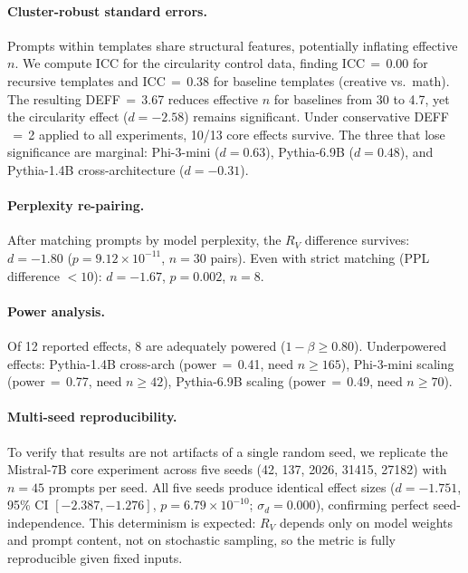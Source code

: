 \documentclass{article}
\newcommand{\RV}{R_V}
\newcommand{\dcohen}{d}
\begin{document}
\paragraph{Cluster-robust standard errors.}
Prompts within templates share structural features, potentially inflating effective $n$.
We compute ICC for the circularity control data, finding ICC$\,{=}\,$0.00 for recursive templates and ICC$\,{=}\,$0.38 for baseline templates (creative vs.\ math).
The resulting DEFF$\,{=}\,$3.67 reduces effective $n$ for baselines from 30 to 4.7, yet the circularity effect ($\dcohen{=}{-}2.58$) remains significant.
Under conservative DEFF$\,{=}\,$2 applied to all experiments, 10/13 core effects survive.
The three that lose significance are marginal: Phi-3-mini ($\dcohen{=}0.63$), Pythia-6.9B ($\dcohen{=}0.48$), and Pythia-1.4B cross-architecture ($\dcohen{=}{-}0.31$).

\paragraph{Perplexity re-pairing.}
After matching prompts by model perplexity, the $\RV$ difference survives: $\dcohen{=}{-}1.80$ ($p{=}9.12 \times 10^{-11}$, $n{=}30$ pairs).
Even with strict matching (PPL difference $< 10$): $\dcohen{=}{-}1.67$, $p{=}0.002$, $n{=}8$.

\paragraph{Power analysis.}
Of 12 reported effects, 8 are adequately powered ($1{-}\beta \geq 0.80$).
Underpowered effects: Pythia-1.4B cross-arch (power$\,{=}\,$0.41, need $n{\geq}165$), Phi-3-mini scaling (power$\,{=}\,$0.77, need $n{\geq}42$), Pythia-6.9B scaling (power$\,{=}\,$0.49, need $n{\geq}70$).

\paragraph{Multi-seed reproducibility.}
To verify that results are not artifacts of a single random seed, we replicate the Mistral-7B core experiment across five seeds (42, 137, 2026, 31415, 27182) with $n{=}45$ prompts per seed.
All five seeds produce identical effect sizes ($\dcohen{=}{-}1.751$, 95\% CI $[-2.387, -1.276]$, $p{=}6.79 \times 10^{-10}$; $\sigma_d{=}0.000$), confirming perfect seed-independence.
This determinism is expected: $\RV$ depends only on model weights and prompt content, not on stochastic sampling, so the metric is fully reproducible given fixed inputs.
\end{document}
